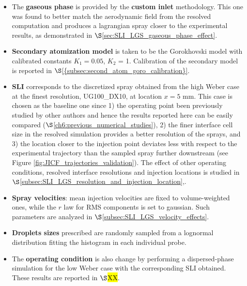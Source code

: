 \begin{itemize}

	\item The \textbf{gaseous phase} is provided by the \textbf{custom inlet} methodology. This one was found to better match the aerodynamic field from the resolved computation and produces a lagrangian spray closer to the experimental results, as demonstrated in $\S$\ref{sec:SLI_LGS_gaseous_phase_effect}.
	
	\item \textbf{Secondary atomization model} is taken to be the Gorokhovski model with calibrated constants $K_1 = 0.05$, $K_2$ = 1. Calibration of the secondary model is reported in $\S$\ref{{subsec:second_atom_goro_calibration}}.
	
	\item \textbf{SLI} corresponds to the discretized spray obtained from the high Weber case at the finest resolution, UG100\_DX10, at location $x = 5$ mm. This case is chosen as the baseline one since 1) the operating point been previously studied by other authors and hence the results reported here can be easily compared ($\S$\ref{ch6:previous_numerical_studies}), 2) the finer interface cell size in the resolved simulation provides a better resolution of the sprays, and 3) the location closer to the injection point deviates less with respect to the experimental trajectory than the sampled spray further downstream (see Figure \ref{fig:JICF_trajectories_validation}). The effect of other operating conditions, resolved interface resolutions and injection locations is studied in $\S$\ref{subsec:SLI_LGS_resolution_and_injection_location},.
	
	\item \textbf{Spray velocities}: mean injection velocities are fixed to volume-weighted ones, while the $r$ law for RMS components is set to gaussian. Such parameters are analyzed in $\S$\ref{subsec:SLI_LGS_velocity_effects}.
	
	\item \textbf{Droplets sizes} prescribed are randomly sampled from a lognormal distribution fitting the histogram in each individual probe. 
	
	\item The \textbf{operating condition} is also change by performing a dispersed-phase simulation for the low Weber case with the corresponding SLI obtained. These results are reported in $\S$\hl{XX}.

\end{itemize}






